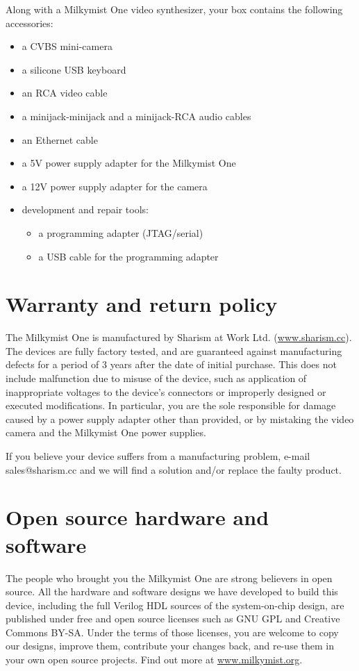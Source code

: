 \documentclass{leaflet}
\begin{document}
Along with a Milkymist One video synthesizer, your box contains the following accessories:
\begin{itemize}
\item a CVBS mini-camera
\item a silicone USB keyboard
\item an RCA video cable
\item a minijack-minijack and a minijack-RCA audio cables
\item an Ethernet cable
\item a 5V power supply adapter for the Milkymist One
\item a 12V power supply adapter for the camera
\item development and repair tools:
\begin{itemize}
\item a programming adapter (JTAG/serial)
\item a USB cable for the programming adapter
\end{itemize}
\end{itemize}

\section{Warranty and return policy}
The Milkymist One is manufactured by Sharism at Work Ltd. (\url{www.sharism.cc}). The devices are fully factory tested, and are guaranteed against manufacturing defects for a period of 3 years after the date of initial purchase. This does not include malfunction due to misuse of the device, such as application of inappropriate voltages to the device's connectors or improperly designed or executed modifications. In particular, you are the sole responsible for damage caused by a power supply adapter other than provided, or by mistaking the video camera and the Milkymist One power supplies.

If you believe your device suffers from a manufacturing problem, e-mail sales@sharism.cc and we will find a solution and/or replace the faulty product.

\section{Open source hardware and software}
The people who brought you the Milkymist One are strong believers in open source. All the hardware and software designs we have developed to build this device, including the full Verilog HDL sources of the system-on-chip design, are published under free and open source licenses such as GNU GPL and Creative Commons BY-SA. Under the terms of those licenses, you are welcome to copy our designs, improve them, contribute your changes back, and re-use them in your own open source projects. Find out more at \url{www.milkymist.org}.
\end{document}
